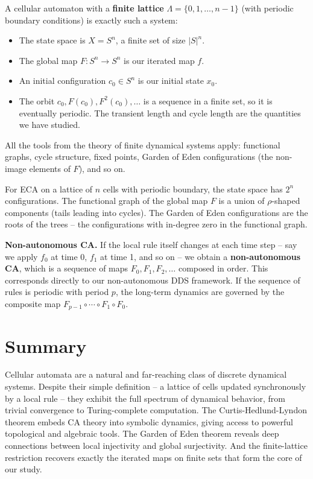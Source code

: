 A cellular automaton with a \textbf{finite lattice} $\Lambda = \{ 0, 1, \ldots, n-1\} $ (with periodic boundary conditions) is exactly such a system:

\begin{itemize}
\item The state space is $X = S^n$, a finite set of size $|S|^n$.
\item The global map $F: S^n \to S^n$ is our iterated map $f$.
\item An initial configuration $c_0 \in S^n$ is our initial state $x_0$.
\item The orbit $c_0, F(c_0), F^2(c_0), \ldots$ is a sequence in a finite set, so it is eventually periodic. The transient length and cycle length are the quantities we have studied.
\end{itemize}

All the tools from the theory of finite dynamical systems apply: functional graphs, cycle structure, fixed points, Garden of Eden configurations (the non-image elements of $F$), and so on.

For ECA on a lattice of $n$ cells with periodic boundary, the state space has $2^n$ configurations. The functional graph of the global map $F$ is a union of $\rho$-shaped components (tails leading into cycles). The Garden of Eden configurations are the roots of the trees -- the configurations with in-degree zero in the functional graph.

\textbf{Non-autonomous CA.} If the local rule itself changes at each time step -- say we apply $f_0$ at time 0, $f_1$ at time 1, and so on -- we obtain a \textbf{non-autonomous CA}, which is a sequence of maps $F_0, F_1, F_2, \ldots$ composed in order. This corresponds directly to our non-autonomous DDS framework. If the sequence of rules is periodic with period $p$, the long-term dynamics are governed by the composite map $F_{p-1} \circ \cdots \circ F_1 \circ F_0$.


\section{Summary}

Cellular automata are a natural and far-reaching class of discrete dynamical systems. Despite their simple definition -- a lattice of cells updated synchronously by a local rule -- they exhibit the full spectrum of dynamical behavior, from trivial convergence to Turing-complete computation. The Curtis-Hedlund-Lyndon theorem embeds CA theory into symbolic dynamics, giving access to powerful topological and algebraic tools. The Garden of Eden theorem reveals deep connections between local injectivity and global surjectivity. And the finite-lattice restriction recovers exactly the iterated maps on finite sets that form the core of our study.


